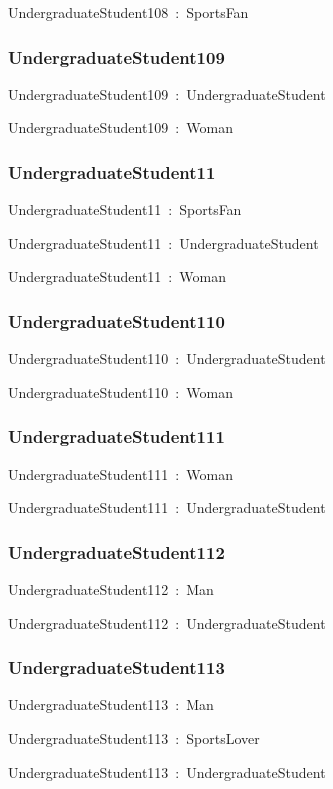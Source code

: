 \documentclass{article}
\begin{document}
UndergraduateStudent108~:~SportsFan

\subsubsection*{UndergraduateStudent109}

UndergraduateStudent109~:~UndergraduateStudent

UndergraduateStudent109~:~Woman

\subsubsection*{UndergraduateStudent11}

UndergraduateStudent11~:~SportsFan

UndergraduateStudent11~:~UndergraduateStudent

UndergraduateStudent11~:~Woman

\subsubsection*{UndergraduateStudent110}

UndergraduateStudent110~:~UndergraduateStudent

UndergraduateStudent110~:~Woman

\subsubsection*{UndergraduateStudent111}

UndergraduateStudent111~:~Woman

UndergraduateStudent111~:~UndergraduateStudent

\subsubsection*{UndergraduateStudent112}

UndergraduateStudent112~:~Man

UndergraduateStudent112~:~UndergraduateStudent

\subsubsection*{UndergraduateStudent113}

UndergraduateStudent113~:~Man

UndergraduateStudent113~:~SportsLover

UndergraduateStudent113~:~UndergraduateStudent
\end{document}
